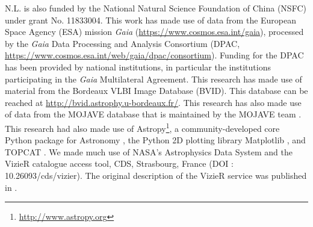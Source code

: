 \documentclass{aa}
\begin{document}
\begin{acknowledgements}
  N.L. is also funded by the National Natural Science Foundation of China (NSFC) under grant No. 11833004.
  This work has made use of data from the European Space Agency (ESA) mission {\it Gaia} (\url{https://www.cosmos.esa.int/gaia}), processed by the {\it Gaia} Data Processing and Analysis Consortium (DPAC, \url{https://www.cosmos.esa.int/web/gaia/dpac/consortium}).
  Funding for the DPAC has been provided by national institutions, in particular the institutions participating in the {\it Gaia} Multilateral Agreement.
  This research has made use of material from the Bordeaux VLBI Image Database (BVID).
  This database can be reached at \url{http://bvid.astrophy.u-bordeaux.fr/}.
  This research has also made use of data from the MOJAVE database that is maintained by the MOJAVE team \citep{2018ApJS..234...12L}.
  This research had also made use of Astropy\footnote{\href{http://www.astropy.org}{http://www.astropy.org}}, a community-developed core Python package for Astronomy \citep{2018AJ....156..123A},
  the Python 2D plotting library Matplotlib \citep{2007CSE.....9...90H}, and TOPCAT \citep{2011ascl.soft01010T}.
  We made much use of NASA's Astrophysics Data System and the VizieR catalogue access tool, CDS,
  Strasbourg, France (DOI : 10.26093/cds/vizier). The original description of the VizieR service was published in \citet{2000A&AS..143...23O}.

\end{acknowledgements}


\end{document}
